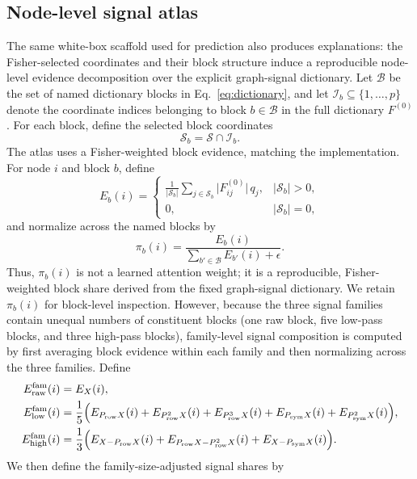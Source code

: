\documentclass{article}
\newcommand{\Prw}{P_{\mathrm{row}}}
\newcommand{\Psy}{P_{\mathrm{sym}}}
\newcommand{\Ffull}{F^{(0)}}
\newcommand{\Sel}{\mathcal{S}}
\newcommand{\Blocks}{\mathcal{B}}
\newcommand{\BlockIdx}{\mathcal{I}}
\begin{document}
\subsection{Node-level signal atlas}
The same white-box scaffold used for prediction also produces explanations:
the Fisher-selected coordinates and their block structure induce a reproducible
node-level evidence decomposition over the explicit graph-signal dictionary. Let
$\Blocks$ be the set of named dictionary blocks in
Eq.~\eqref{eq:dictionary}, and let
$\BlockIdx_b\subseteq\{1,\ldots,p\}$ denote the coordinate indices belonging
to block $b\in\Blocks$ in the full dictionary $\Ffull$. For each block, define
the selected block coordinates
\[
\Sel_b = \Sel \cap \BlockIdx_b.
\]
The atlas uses a Fisher-weighted block evidence, matching the implementation.
For node $i$ and block $b$, define
\begin{equation}
E_b(i)
=
\begin{cases}
\displaystyle
\frac{1}{|\Sel_b|}
\sum_{j\in\Sel_b}
\bigl|\Ffull_{ij}\bigr|\, q_j,
& |\Sel_b|>0,\\[1.2ex]
0, & |\Sel_b|=0,
\end{cases}
\label{eq:block-evidence}
\end{equation}
and normalize across the named blocks by
\begin{equation}
\pi_b(i)
=
\frac{E_b(i)}
{\sum_{b'\in\Blocks}E_{b'}(i)+\epsilon}.
\label{eq:block-share}
\end{equation}
Thus, $\pi_b(i)$ is not a learned attention weight; it is a reproducible,
Fisher-weighted block share derived from the fixed graph-signal dictionary.
We retain $\pi_b(i)$ for block-level inspection. However, because the three
signal families contain unequal numbers of constituent blocks (one raw block,
five low-pass blocks, and three high-pass blocks), family-level signal
composition is computed by first averaging block evidence within each family
and then normalizing across the three families. Define
\begin{align}
E_{\mathrm{raw}}^{\mathrm{fam}}(i)
&=
E_{X}(i),\\
E_{\mathrm{low}}^{\mathrm{fam}}(i)
&=
\frac{1}{5}\Bigl(
E_{\Prw X}(i)
+
E_{\Prw^2 X}(i)
+
E_{\Prw^3 X}(i)
+
E_{\Psy X}(i)
+
E_{\Psy^2 X}(i)
\Bigr),\\
E_{\mathrm{high}}^{\mathrm{fam}}(i)
&=
\frac{1}{3}\Bigl(
E_{X-\Prw X}(i)
+
E_{\Prw X-\Prw^2 X}(i)
+
E_{X-\Psy X}(i)
\Bigr).
\label{eq:family-evidence}
\end{align}
We then define the family-size-adjusted signal shares by
\end{document}
